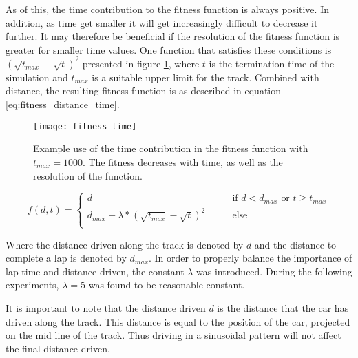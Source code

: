 As of this, the time contribution to the fitness function is always positive. In addition, as time get smaller it will get increasingly difficult to decrease it further. It may therefore be beneficial if the resolution of the fitness function is greater for smaller time values. One function that satisfies these conditions is \((\sqrt{t_{max}} - \sqrt{t})^2\) presented in figure \ref{figure:time_fitness}, where $t$ is the termination time of the simulation and $t_{max}$ is a suitable upper limit for the track. Combined with distance, the resulting fitness function is as described in equation \ref{eq:fitness_distance_time}.


\begin{figure}
\texttt{[image: fitness\_time]}
\caption{Example use of the time contribution in the fitness function with $t_{max} = 1000$. The fitness decreases with time, as well as the resolution of the function.}
\label{figure:time_fitness}
\centering
\end{figure}

\begin{equation}
\label{eq:fitness_distance_time}
  f(d, t) =
  \begin{cases}
    d    & \qquad \text{if } d < d_{max} \text{ or } t \geq t_{max} \\
    d_{max} + \lambda*(\sqrt{t_{max}} - \sqrt{t})^2 & \qquad \text{else} \\
  \end{cases}
\end{equation}

\noindent
Where the distance driven along the track is denoted by $d$ and the distance to complete a lap is denoted by $d_{max}$. In order to properly balance the importance of lap time and distance driven, the constant $\lambda$ was introduced. During the following experiments, $\lambda=5$ was found to be reasonable constant.


It is important to note that the distance driven $d$ is the distance that the car has driven along the track. This distance is equal to the position of the car, projected on the mid line of the track. Thus driving in a sinusoidal pattern will not affect the final distance driven.


